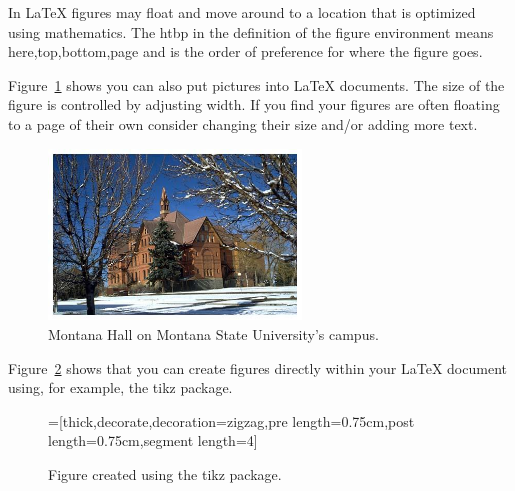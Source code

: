 In \LaTeX{} figures may float and move around to a location that is optimized using mathematics. The htbp in the definition of the figure environment means here,top,bottom,page and is the order of preference for where the figure goes.  

Figure~\ref{fig:photo} shows you can also put pictures into \LaTeX{} documents.  The size of the figure is controlled by adjusting width.  If you find your figures are often floating to a page of their own consider changing their size and/or adding more text.

\begin{figure}[htbp]
  \centering
  \includegraphics[width=0.6\textwidth]{figs/MSU.jpg}
  \caption{Montana Hall on Montana State University's campus.}
  \label{fig:photo}
\end{figure}

Figure~\ref{fig:tikz} shows that you can create figures directly within your \LaTeX{} document using, for example, the tikz package.
\begin{figure}[htbp]
  \centering
  =[thick,decorate,decoration={zigzag,pre length=0.75cm,post length=0.75cm,segment length=4}]
  \caption{Figure created using the tikz package.}
  \label{fig:tikz}
\end{figure}


